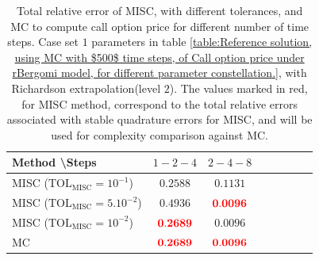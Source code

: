 \begin{table}[!h]
	\centering
	\begin{tabular}{l*{6}{c}r}
		Method \textbackslash  Steps            & $1-2-4$ & $2-4-8$  \\
		\hline
		MISC ($\text{TOL}_{\text{MISC}}=10^{-1}$)  & $\mathbf{ 0.2588
		}$ & $\mathbf{ 0.1131}$ \\
		MISC ($\text{TOL}_{\text{MISC}}=5.10^{-2}$)  & $\mathbf{   0.4936
		}$ & $\mathbf{{\color{red} 0.0096} }$  \\
		MISC ($\text{TOL}_{\text{MISC}}=10^{-2}$)  & $\mathbf{ {\color{red}0.2689}}$ & $\mathbf{ 0.0096 }$    \\	
		\hline
		MC   & $\mathbf{{\color{red}0.2689}}$  & $\mathbf{{\color{red} 0.0096}}$    \\
		\hline
	\end{tabular}
	\caption{Total relative  error of MISC, with different tolerances, and MC to compute call option price   for different number of time steps. Case set $1$ parameters in table \ref{table:Reference solution, using MC with $500$ time steps, of Call option price under rBergomi model, for different parameter constellation.}, with Richardson extrapolation(level $2$). The values marked in red, for MISC method, correspond to the total relative errors associated with  stable quadrature errors for MISC, and will be used for complexity comparison against MC.}
	\label{Total  error of MISC and MC to compute Call option price of the different tolerances for different number of time steps. Case set $2$ parameters, with Richardson extrapolation(level $2$). The numbers between parentheses are the corresponding absolute errors,linear}
\end{table}
\FloatBarrier

